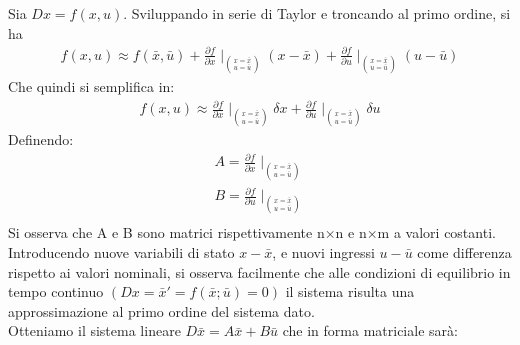 Sia $Dx = f(x,u)$. Sviluppando in serie di Taylor e troncando al primo ordine, si ha
\begin{displaymath}
\begin{array}{l}
f(x,u) \approx f(\bar x,\bar u) + \frac{\partial f}{\partial x}\mid_{\binom{x=\bar{x}}{u=\bar{u}}}(x-\bar x) + \frac{\partial f}{\partial u}\mid_{\binom{x=\bar{x}}{u=\bar{u}}}(u-\bar u)
\end{array}
\end{displaymath}
Che quindi si semplifica in:
\begin{displaymath}
\begin{array}{l}
f(x,u) \approx \frac{\partial f}{\partial x}\mid_{\binom{x=\bar{x}}{u=\bar{u}}}\delta x + \frac{\partial f}{\partial u}\mid_{\binom{x=\bar{x}}{u=\bar{u}}}\delta u
\end{array}
\end{displaymath}
Definendo:
\begin{displaymath}
\begin{array}{l}
A=\frac{\partial f}{\partial x}\mid_{\binom{x=\bar{x}}{u=\bar{u}}} \\
B=\frac{\partial f}{\partial u}\mid_{\binom{x=\bar{x}}{u=\bar{u}}} \\
\end{array}
\end{displaymath}
Si osserva che A e B sono matrici rispettivamente n×n e n×m a valori costanti. Introducendo nuove variabili di stato $x-\bar x$, e nuovi ingressi $u-\bar u$ come differenza rispetto ai valori nominali, si osserva facilmente che alle condizioni di equilibrio in tempo continuo $(Dx=\bar x'=f(\bar x;\bar u)=0)$ il sistema risulta una approssimazione al primo ordine del sistema dato. \\
Otteniamo il sistema lineare $D\bar x = A \bar x + B\bar u$ che in forma matriciale sarà: 
